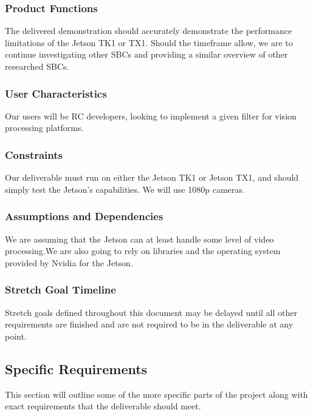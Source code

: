 \subsubsection{Product Functions}
The delivered demonstration should accurately demonstrate the performance limitations of the Jetson TK1 or TX1. Should the timeframe allow, we are to continue investigating other SBCs and providing a similar overview of other researched SBCs.\\

\subsubsection{User Characteristics}
Our users will be RC developers, looking to implement a given filter for vision processing platforms.\\

\subsubsection{Constraints}
Our deliverable must run on either the Jetson TK1 or Jetson TX1, and should simply test the Jetson's capabilities. We will use 1080p cameras.\\

\subsubsection{Assumptions and Dependencies}
We are assuming that the Jetson can at least handle some level of video processing.We are also going to rely on libraries and the operating system provided by Nvidia for the Jetson.\\

\subsubsection{Stretch Goal Timeline}
Stretch goals defined throughout this document may be delayed until all other requirements are finished and are not required to be in the deliverable at any point.

\subsection{Specific Requirements}
This section will outline some of the more specific parts of the project along with exact requirements that the deliverable should meet.\\

